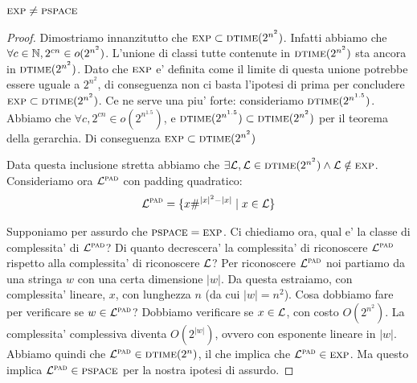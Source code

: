 \begin{thm}
    $\textsc{exp} \not= \textsc{pspace}$
\end{thm}
\begin{proof}
    
    Dimostriamo innanzitutto che $\textsc{exp} \subset \textsc{dtime}(2^{n^{2}})$. Infatti abbiamo che $\forall c
    \in \mathbb{N}, 2^{cn} \in o(2^{n^{2}})$. L'unione di classi tutte contenute in $\textsc{dtime}(2^{n^{2}})$
    sta ancora in $\textsc{dtime}(2^{n^{2}})$. Dato che $\textsc{exp}$ e' definita come il limite di questa unione
    potrebbe essere uguale a $2^{n^{2}}$, di conseguenza non ci basta l'ipotesi di prima per
    concludere $\textsc{exp} \subset \textsc{dtime}(2^{n^{2}})$. Ce ne serve una piu' forte: consideriamo
    $\textsc{dtime}(2^{n^{1.5}})$. Abbiamo che $\forall c,2^{cn} \in o(2^{n^{1.5}})$, e $\textsc{dtime}(2^{n^{1.5}})
    \subset \textsc{dtime}(2^{n^{2}})$ per il teorema della gerarchia. Di conseguenza $\textsc{exp} \subset
    \textsc{dtime}(2^{n^{2}})$

    Data questa inclusione stretta abbiamo che $\exists \mathcal{L}, \mathcal{L} \in \textsc{dtime}(2^{n^{2}}) \land
    \mathcal{L} \notin \textsc{exp}$. Consideriamo ora $\mathcal{L}^{\textsc{pad}}$ con padding quadratico:
    \begin{equation*}
        \mathcal{L}^{\textsc{pad}} = \{ x\#^{|x|^{2}-|x|} \mid x \in \mathcal{L}\}
    \end{equation*}

    Supponiamo per assurdo che $\textsc{pspace} = \textsc{exp}$. Ci chiediamo ora, qual e' la classe di complessita'
    di $\mathcal{L}^{\textsc{pad}}$? Di quanto decrescera' la complessita' di riconoscere $\mathcal{L}^{\textsc{pad}}$ rispetto alla
    complessita' di riconoscere $\mathcal{L}$? Per riconoscere $\mathcal{L}^{\textsc{pad}}$ noi partiamo da una stringa $w$ con
    una certa dimensione $|w|$. Da questa estraiamo, con complessita' lineare, $x$, con lunghezza
    $n$ (da cui $|w| = n^{2}$). Cosa dobbiamo fare per verificare se $w \in \mathcal{L}^{\textsc{pad}}$?  Dobbiamo
    verificare se $x \in \mathcal{L}$, con costo $O(2^{n^{2}})$. La complessita' complessiva diventa
    $O(2^{|w|})$, ovvero con esponente lineare in $|w|$. Abbiamo quindi che $\mathcal{L}^{\textsc{pad}} \in
    \textsc{dtime}(2^{n})$, il che implica che $\mathcal{L}^{\textsc{pad}} \in \textsc{exp}$. Ma questo implica  $\mathcal{L}^{\textsc{pad}} \in \textsc{pspace}$ per
    la nostra ipotesi di assurdo.


\end{proof}
